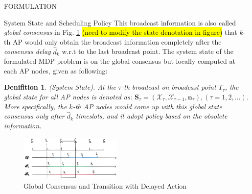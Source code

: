 \documentclass[10pt, conference, letterpaper]{IEEEtran}
\newtheorem{definition}{Denifition}
\renewcommand{\vec}{\mathbf}
\newcommand{\Stat}{\mathbf{S}}
\newcommand{\Obsv}{\mathcal{X}}
\begin{document}
\begin{section}{FORMULATION}
\begin{subsection}{System State and Scheduling Policy}
            This broadcast information is also called \emph{global consensus} in Fig. \ref{fig:br-trans} \hl{(need to modify the state denotation in figure)} that $k$-th AP would only obtain the broadcast information completely after the \emph{consensus delay} $\hat{d}_{k}$ w.r.t to the last broadcast point. The system state of the formulated MDP problem is on the global consensus but locally computed at each AP nodes, given as following:
            \begin{definition}(System State).
                At the $\tau$-th broadcast on broadcast point $T_\tau$, the global state for all AP nodes is denoted as: $\Stat_\tau = (\Obsv_{\tau}, \Obsv_{\tau-1}, \vec{n}_\tau), (\tau=1,2,\dots)$.
                More specifically, the $k$-th AP nodes would come up with this global state consensus only after $\hat{d}_k$ timeslots, and it adopt policy based on the obsolete information.
            \end{definition}
            \begin{figure}[ht]
                \centering
                \includegraphics[width=0.45\textwidth]{broadcast-trans.png}
                \caption{Global Consensus and Transition with Delayed Action}
                \label{fig:br-trans}
            \end{figure}


\end{subsection}
\end{section}
\end{document}
